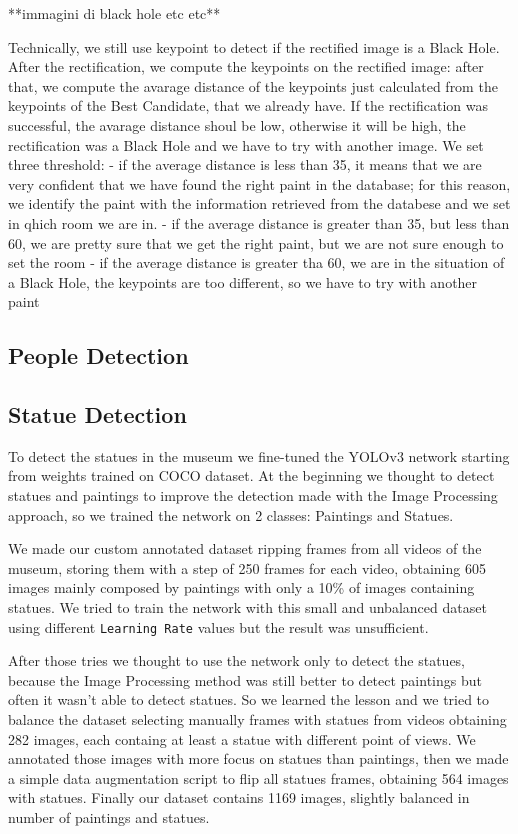 \documentclass[10pt,twocolumn,letterpaper]{article}
\begin{document}
**immagini di black hole etc etc**

Technically, we still use keypoint to detect if the rectified image is a Black Hole. After the rectification, we compute the keypoints on the rectified image: after that, we compute the avarage distance of the keypoints just calculated from the keypoints of the Best Candidate, that we already have. If the rectification was successful, the avarage distance shoul be low, otherwise it will be high, the rectification was a Black Hole and we have to try with another image.
We set three threshold:
	- if the average distance is less than 35, it means that we are very confident that we have found the right paint in the database; for this reason, we identify the paint with the information retrieved from the databese and we set in qhich room we are in.
	- if the average distance is greater than 35, but less than 60, we are pretty sure that we get the right paint, but we are not sure enough to set the room
	- if the average distance is greater tha 60, we are in the situation of a Black Hole, the keypoints are too different, so we have to try with another paint 
\subsection{People Detection}

\subsection{Statue Detection}

To detect the statues in the museum we fine-tuned the YOLOv3 network starting from
weights trained on COCO dataset. At the beginning we thought to detect statues and paintings
to improve the detection made with the Image Processing approach, so we trained the network
on 2 classes: Paintings and Statues.

We made our custom annotated dataset ripping frames from all videos of the museum, storing
them with a step of 250 frames for each video, obtaining 605 images mainly composed by paintings 
with only a 10\% of images containing statues.
We tried to train the network with this small and unbalanced dataset using different {\tt Learning Rate} 
values but the result was unsufficient.

After those tries we thought to use the network only to detect the statues, because the Image Processing
method was still better to detect paintings but often it wasn't able to detect statues.
So we learned the lesson and we tried to balance the dataset selecting manually frames with statues
from videos obtaining 282 images, each containg at least a statue with different point of views.
We annotated those images with more focus on statues than paintings, then we made a simple data 
augmentation script to flip all statues frames, obtaining 564 images with statues.
Finally our dataset contains 1169 images, slightly balanced in number of paintings and statues.
\end{document}

